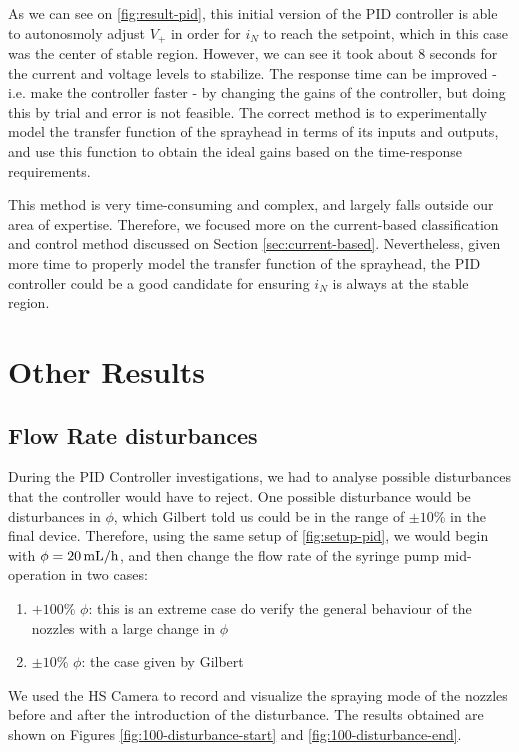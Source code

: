 \documentclass[oneside,12pt]{article}
\begin{document}
As we can see on \autoref{fig:result-pid}, this initial version of the PID controller is able to autonosmoly adjust $V_+$ in order
for $i_N$ to reach the setpoint, which in this case was the center of stable region.
However, we can see it took about 8 seconds for the current and voltage levels to stabilize.
The response time can be improved - i.e. make the controller faster - by changing the gains of the controller, 
but doing this by trial and
error is not feasible. The correct method is to experimentally model the transfer function of the sprayhead in terms 
of its inputs and outputs, and use this function to obtain the ideal gains based on the time-response requirements. 

This method is very time-consuming and complex, and largely falls outside our area of expertise. Therefore, we focused
more on the current-based classification and control method discussed on Section \ref{sec:current-based}. Nevertheless, 
given more time to properly model the transfer function of the sprayhead, the PID controller could be a good candidate 
for ensuring $i_N$ is always at the stable region.

\section{Other Results}\label{sec:utils}

\subsection{Flow Rate disturbances}

During the PID Controller investigations, we had to analyse possible disturbances that the controller would have to reject.
One possible disturbance would be disturbances in $\phi$, which Gilbert told us could be in the range of $\pm 10\%$ in the
final device. Therefore, using the same setup of \autoref{fig:setup-pid}, we would begin with $\phi = 20 \,\mathrm{mL/h}$, and then 
change the flow rate of the syringe pump mid-operation in two cases:

\begin{enumerate}
    \item $+ 100\% \,\, \phi$: this is an extreme case do verify the general behaviour of the nozzles with a large change in $\phi$
    \item $\pm 10\%  \,\,\phi$: the case given by Gilbert
\end{enumerate}

We used the HS Camera to record and visualize the spraying mode of the nozzles before and after the introduction of the disturbance.
The results obtained are shown on Figures \ref{fig:100-disturbance-start} and \ref{fig:100-disturbance-end}.
\end{document}
